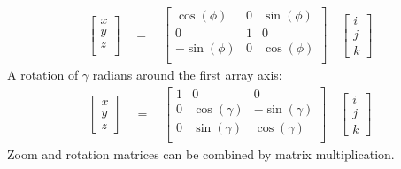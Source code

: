 \documentclass[letterpaper,10pt,english]{sphinxmanual}
\begin{document}
\begin{equation*}
\begin{split}
\begin{bmatrix}
x \\
y \\
z \\
\end{bmatrix}
\quad
=
\quad
\begin{bmatrix}
\cos(\phi) & 0 & \sin(\phi) \\
0 & 1 & 0 \\
-\sin(\phi) & 0 & \cos(\phi) \\
\end{bmatrix}
\quad
\begin{bmatrix}
i \\
j \\
k 
\end{bmatrix}
\end{split}
\end{equation*}
A rotation of \(\gamma\) radians around the first array axis:
\begin{equation*}
\begin{split}
\begin{bmatrix}
x\\
y\\
z
\end{bmatrix}
\quad
=
\quad
\begin{bmatrix}
1 & 0 & 0 \\
0 & \cos(\gamma) & -\sin(\gamma) \\
0 & \sin(\gamma) & \cos(\gamma) \\
\end{bmatrix}
\quad
\begin{bmatrix}
i \\
j \\
k
\end{bmatrix}
\end{split}
\end{equation*}
Zoom and rotation matrices can be combined by matrix multiplication.
\end{document}
